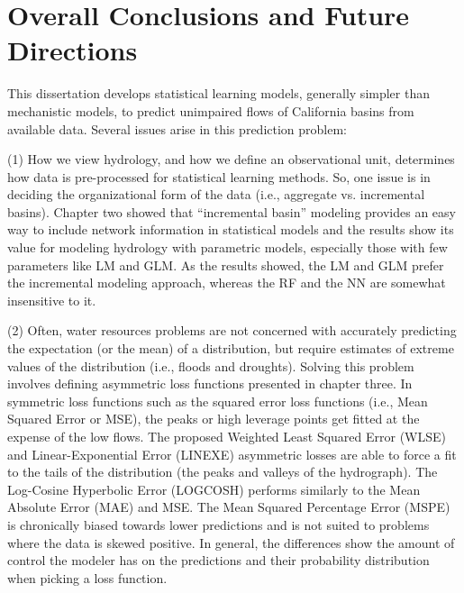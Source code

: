 \chapter{Overall Conclusions and Future Directions}

This dissertation develops statistical learning models, generally simpler than mechanistic models, to predict unimpaired flows of California basins from available data. Several issues arise in this prediction problem: 

(1) How we view hydrology, and how we define an observational unit, determines how data is pre-processed for statistical learning methods. So, one issue is in deciding the organizational form of the data (i.e., aggregate vs. incremental basins). Chapter two showed that ``incremental basin'' modeling provides an easy way to include network information in statistical models and the results show its value for modeling hydrology with parametric models, especially those with few parameters like LM and GLM. As the results showed, the LM and GLM prefer the incremental modeling approach, whereas the RF and the NN are somewhat insensitive to it. 

(2) Often, water resources problems are not concerned with accurately predicting the expectation (or the mean) of a distribution, but require estimates of extreme values of the distribution (i.e., floods and droughts). Solving this problem involves defining asymmetric loss functions presented in chapter three. In symmetric loss functions such as the squared error loss functions (i.e., Mean Squared Error or MSE), the peaks or high leverage points get fitted at the expense of the low flows. The proposed Weighted Least Squared Error (WLSE) and Linear-Exponential Error (LINEXE) asymmetric losses are able to force a fit to the tails of the distribution (the peaks and valleys of the hydrograph). The Log-Cosine Hyperbolic Error (LOGCOSH) performs similarly to the Mean Absolute Error (MAE) and MSE. The Mean Squared Percentage Error (MSPE) is chronically biased towards lower predictions and is not suited to problems where the data is skewed positive. In general, the differences show the amount of control the modeler has on the predictions and their probability distribution when picking a loss function.

